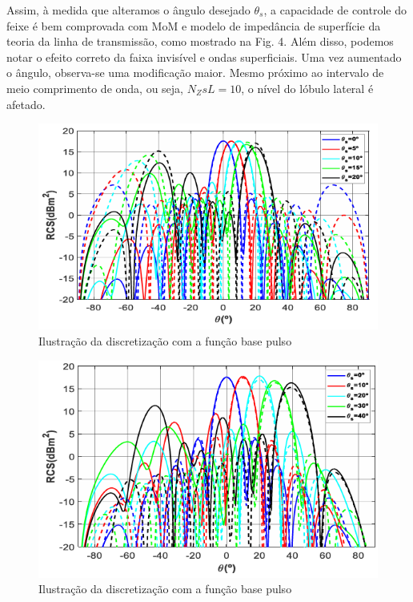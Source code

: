\documentclass[
	12pt,				%
	openright,			%
	oneside,			%
	a4paper,			%
	english,			%
	brazil				%
	]{abntex2}
\begin{document}
Assim, à medida que alteramos o ângulo desejado $θ_s$, a capacidade de controle do feixe é bem comprovada com MoM e modelo de impedância de superfície da teoria da linha de transmissão, como mostrado na Fig. 4. Além disso, podemos notar o efeito correto da faixa invisível e ondas superficiais. Uma vez aumentado o ângulo, observa-se uma modificação maior. Mesmo próximo ao intervalo de meio comprimento de onda, ou seja, $N_ZsL=10$, o nível do lóbulo lateral é afetado.


\begin{figure}[htb]
 \label{RCS5}
    \centering
    \caption{Ilustração da discretização  com a função base pulso} \label{fig_minipage}
    \includegraphics[width=\textwidth]{figures/RCSBeam5.png}
  \hfill
  
\end{figure}


\begin{figure}[htb]
 \label{RCS10}
    \centering
    \caption{Ilustração da discretização  com a função base pulso} \label{fig_minipage}
    \includegraphics[width=\textwidth]{figures/RCSBeam10.png}
  \hfill
\end{figure}
\end{document}
